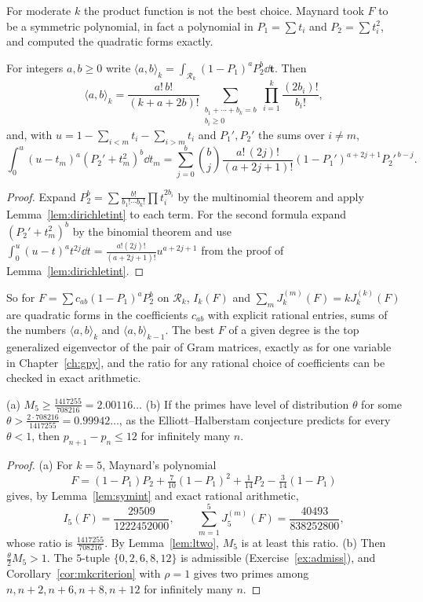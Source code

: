 For moderate $k$ the product function is not the best choice. Maynard took $F$ to be a symmetric polynomial, in fact a polynomial in $P_1=\sum t_i$ and $P_2=\sum t_i^2$, and computed the quadratic forms exactly.

\begin{lemma}\label{lem:symint}
For integers $a,b\ge0$ write $\langle a,b\rangle_k=\int_{\mathcal R_k}(1-P_1)^aP_2^b\dd\mathbf t$. Then
\[
\langle a,b\rangle_k=\frac{a!\,b!}{(k+a+2b)!}\sum_{\substack{b_1+\cdots+b_k=b\\b_i\ge0}}\prod_{i=1}^k\frac{(2b_i)!}{b_i!},
\]
and, with $u=1-\sum_{i<m}t_i-\sum_{i>m}t_i$ and $P_1',P_2'$ the sums over $i\ne m$,
\[
\int_0^u(u-t_m)^a(P_2'+t_m^2)^b\dd t_m=\sum_{j=0}^b\binom bj\frac{a!\,(2j)!}{(a+2j+1)!}(1-P_1')^{a+2j+1}P_2'^{\,b-j}.
\]
\end{lemma}
\begin{proof}
Expand $P_2^b=\sum\frac{b!}{b_1!\cdots b_k!}\prod t_i^{2b_i}$ by the multinomial theorem and apply Lemma~\ref{lem:dirichletint} to each term. For the second formula expand $(P_2'+t_m^2)^b$ by the binomial theorem and use $\int_0^u(u-t)^at^{2j}\dd t=\frac{a!(2j)!}{(a+2j+1)!}u^{a+2j+1}$ from the proof of Lemma~\ref{lem:dirichletint}.
\end{proof}

So for $F=\sum c_{ab}(1-P_1)^aP_2^b$ on $\mathcal R_k$, $I_k(F)$ and $\sum_mJ_k^{(m)}(F)=kJ_k^{(k)}(F)$ are quadratic forms in the coefficients $c_{ab}$ with explicit rational entries, sums of the numbers $\langle a,b\rangle_k$ and $\langle a,b\rangle_{k-1}$. The best $F$ of a given degree is the top generalized eigenvector of the pair of Gram matrices, exactly as for one variable in Chapter~\ref{ch:gpy}, and the ratio for any rational choice of coefficients can be checked in exact arithmetic.

\begin{theorem}\label{thm:mfive}
(a) $M_5\ge\frac{1417255}{708216}=2.00116\ldots$
(b) If the primes have level of distribution $\theta$ for some $\theta>\frac{2\cdot708216}{1417255}=0.99942\ldots$, as the Elliott--Halberstam conjecture predicts for every $\theta<1$, then $p_{n+1}-p_n\le12$ for infinitely many $n$.
\end{theorem}
\begin{proof}
(a) For $k=5$, Maynard's polynomial
\[
F=(1-P_1)P_2+\tfrac7{10}(1-P_1)^2+\tfrac1{14}P_2-\tfrac3{14}(1-P_1)
\]
gives, by Lemma~\ref{lem:symint} and exact rational arithmetic,
\[
I_5(F)=\frac{29509}{1222452000},\qquad\sum_{m=1}^5J_5^{(m)}(F)=\frac{40493}{838252800},
\]
whose ratio is $\frac{1417255}{708216}$. By Lemma~\ref{lem:ltwo}, $M_5$ is at least this ratio.
(b) Then $\frac\theta2M_5>1$. The $5$-tuple $\{0,2,6,8,12\}$ is admissible (Exercise~\ref{ex:admiss}), and Corollary~\ref{cor:mkcriterion} with $\rho=1$ gives two primes among $n,n+2,n+6,n+8,n+12$ for infinitely many $n$.
\end{proof}

